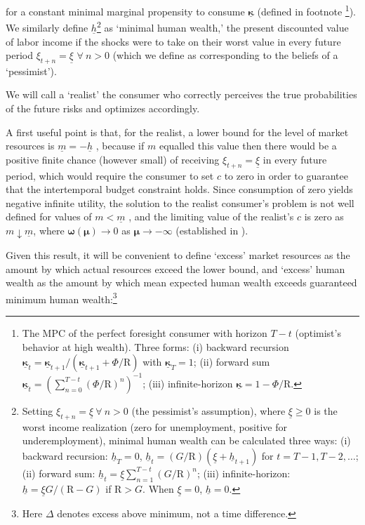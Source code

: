 \documentclass[preprint,authoryear]{elsarticle}
\newcommand{\cNrm}{c}
\newcommand{\Rfree}{\text{R}}
\newcommand{\tranShk}{\xi}
\newcommand{\PermGroFac}{G}
\newcommand{\mNrm}{m}
\newcommand{\AbsPatFac}{\Phi}
\newcommand{\hNrm}{h}
\newcommand{\MPC}{\boldsymbol{\kappa}}
\newcommand{\MPCmin}{\underline{\MPC}}
\newcommand{\hNrmPes}{\underline{\hNrm}}
\newcommand{\tranShkMin}{\underline{\tranShk}}
\newcommand{\mNrmMin}{\underline{\mNrm}}
\newcommand{\logmNrmEx}{\boldsymbol{\mu}}
\newcommand{\modRte}{\boldsymbol{\omega}}
\begin{document}
for a constant minimal marginal propensity to consume $\MPCmin$ (defined in footnote \footnote{The MPC of the perfect foresight consumer with horizon $T -t$ (optimist's behavior at high wealth). Three forms: (i) backward recursion $\MPCmin_{t}=\MPCmin_{t+1}/(\MPCmin_{t+1}+\AbsPatFac/\Rfree)$ with $\MPCmin_T=1$; (ii) forward sum $\MPCmin_{t}=(\sum_{n=0}^{T -t}(\AbsPatFac/\Rfree)^{n})^{ -1}$; (iii) infinite-horizon $\MPCmin=1 -\AbsPatFac/\Rfree$.}). We similarly define
$\hNrmPes$\footnote{Setting $\tranShk_{t+n}=\tranShkMin~\forall~n>0$ (the pessimist's assumption), where $\tranShkMin \geq 0$ is the worst income realization (zero for unemployment, positive for underemployment), minimal human wealth can be calculated three ways: (i) backward recursion: $\hNrmPes_{T}=0$, $\hNrmPes_{t}=(\PermGroFac/\Rfree)(\tranShkMin + \hNrmPes_{t+1})$ for $t = T -1, T -2, \ldots$; (ii) forward sum: $\hNrmPes_{t}=\tranShkMin\sum_{n=1}^{T -t}(\PermGroFac/\Rfree)^{n}$; (iii) infinite-horizon: $\hNrmPes=\tranShkMin\PermGroFac/(\Rfree -\PermGroFac)$ if $\Rfree>\PermGroFac$. When $\tranShkMin=0$, $\hNrmPes=0$.} as `minimal human wealth,' the present
discounted value of labor income if the shocks were to take on their worst
value in every future period
$\tranShk_{t+n} = \tranShkMin$ $\forall~n>0$ (which we define as corresponding to the beliefs of a `pessimist').

We will call a `realist' the consumer who correctly perceives the true
probabilities of the future risks and optimizes accordingly.

A first useful point is that, for the realist, a lower bound for the level of
market resources is $\mNrmMin = -\hNrmPes$ \citep{Aiyagari1994, Huggett1993}, because if $\mNrm$
equalled this value then there would be a positive finite chance (however small)
of receiving $\tranShk_{t+n} = \tranShkMin$ in every future period, which
would require the consumer to set $\cNrm$ to zero in order to guarantee that the
intertemporal budget constraint holds. Since consumption of zero yields negative
infinite utility, the solution to the realist consumer's problem is not well
defined for values of $\mNrm < \mNrmMin$ \citep{Zeldes1989, Deaton1991}, and the limiting value of the
realist's $\cNrm$ is zero as $\mNrm \downarrow \mNrmMin$, where $\modRte(\logmNrmEx) \to 0$ as $\logmNrmEx \to -\infty$ (established in \citet{CarrollShanker2024}).

Given this result, it will be convenient to define `excess' market resources as
the amount by which actual resources exceed the lower bound, and `excess' human
wealth as the amount by which mean expected human wealth exceeds guaranteed
minimum human wealth:\footnote{Here $\Delta$ denotes excess above minimum, not a time difference.}
\end{document}

